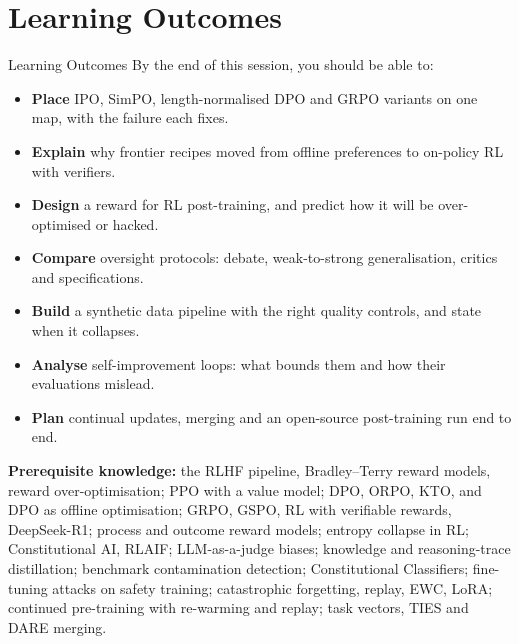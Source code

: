 \section{Learning Outcomes}

\begin{frame}{Learning Outcomes}
    By the end of this session, you should be able to:
    \vspace{0.2em}
    \begin{itemize}\small\itemsep0.15em
        \item \textbf{Place} IPO, SimPO, length-normalised DPO and GRPO variants on one map, with the failure each fixes.
        \item \textbf{Explain} why frontier recipes moved from offline preferences to on-policy RL with verifiers.
        \item \textbf{Design} a reward for RL post-training, and predict how it will be over-optimised or hacked.
        \item \textbf{Compare} oversight protocols: debate, weak-to-strong generalisation, critics and specifications.
        \item \textbf{Build} a synthetic data pipeline with the right quality controls, and state when it collapses.
        \item \textbf{Analyse} self-improvement loops: what bounds them and how their evaluations mislead.
        \item \textbf{Plan} continual updates, merging and an open-source post-training run end to end.
    \end{itemize}
    \vspace{0.3em}
    {\scriptsize \textbf{Prerequisite knowledge:} the RLHF pipeline, Bradley--Terry reward models, reward over-optimisation; PPO with a value model; DPO, ORPO, KTO, and DPO as offline optimisation; GRPO, GSPO, RL with verifiable rewards, DeepSeek-R1; process and outcome reward models; entropy collapse in RL; Constitutional AI, RLAIF; LLM-as-a-judge biases; knowledge and reasoning-trace distillation; benchmark contamination detection; Constitutional Classifiers; fine-tuning attacks on safety training; catastrophic forgetting, replay, EWC, LoRA; continued pre-training with re-warming and replay; task vectors, TIES and DARE merging.\par}
\end{frame}
